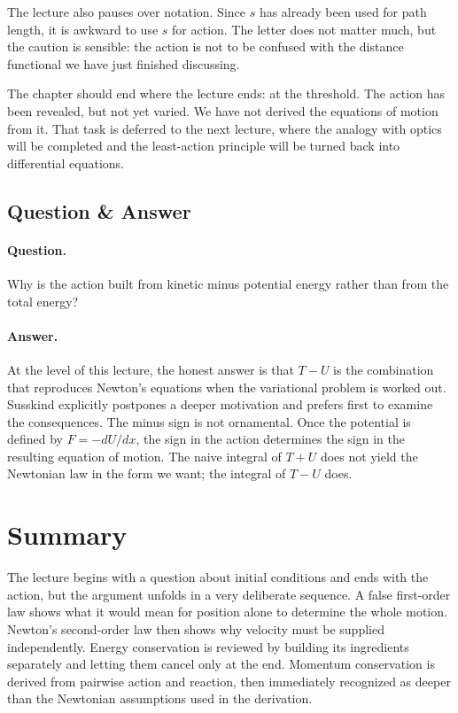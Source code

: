 The lecture also pauses over notation. Since \(s\) has already been used for path length, it is awkward to use \(s\) for action. The letter does not matter much, but the caution is sensible: the action is not to be confused with the distance functional we have just finished discussing.

The chapter should end where the lecture ends: at the threshold. The action has been revealed, but not yet varied. We have not derived the equations of motion from it. That task is deferred to the next lecture, where the analogy with optics will be completed and the least-action principle will be turned back into differential equations.

\subsection{Question \& Answer}

\paragraph{Question.} Why is the action built from kinetic minus potential energy rather than from the total energy?

\paragraph{Answer.} At the level of this lecture, the honest answer is that \(T-U\) is the combination that reproduces Newton's equations when the variational problem is worked out. Susskind explicitly postpones a deeper motivation and prefers first to examine the consequences. The minus sign is not ornamental. Once the potential is defined by \(F=-dU/dx\), the sign in the action determines the sign in the resulting equation of motion. The naive integral of \(T+U\) does not yield the Newtonian law in the form we want; the integral of \(T-U\) does.

\section{Summary}

The lecture begins with a question about initial conditions and ends with the action, but the argument unfolds in a very deliberate sequence. A false first-order law shows what it would mean for position alone to determine the whole motion. Newton's second-order law then shows why velocity must be supplied independently. Energy conservation is reviewed by building its ingredients separately and letting them cancel only at the end. Momentum conservation is derived from pairwise action and reaction, then immediately recognized as deeper than the Newtonian assumptions used in the derivation.


